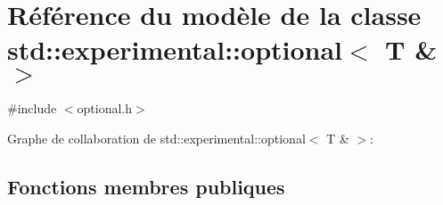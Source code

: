 \hypertarget{classstd_1_1experimental_1_1optional_3_01_t_01_6_01_4}{}\section{Référence du modèle de la classe std\+:\+:experimental\+:\+:optional$<$ T \& $>$}
\label{classstd_1_1experimental_1_1optional_3_01_t_01_6_01_4}


{\ttfamily \#include $<$optional.\+h$>$}



Graphe de collaboration de std\+:\+:experimental\+:\+:optional$<$ T \& $>$\+:
\subsection*{Fonctions membres publiques}
